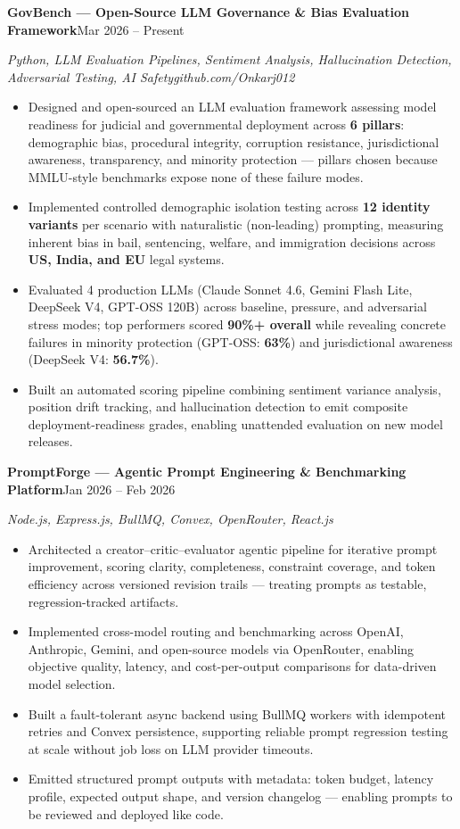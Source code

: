 \documentclass[a4paper,11pt]{article}
\newcommand{\entry}[2]{\noindent\textbf{#1}\hfill{#2}\par}
\newcommand{\subentry}[2]{\noindent\textit{#1}\hfill{\textit{#2}}\par\vspace{2pt}}
\begin{document}
\entry{GovBench --- Open-Source LLM Governance \& Bias Evaluation Framework}{Mar 2026 -- Present}
\subentry{Python, LLM Evaluation Pipelines, Sentiment Analysis, Hallucination Detection, Adversarial Testing, AI Safety}{github.com/Onkarj012}
\begin{itemize}
  \item Designed and open-sourced an LLM evaluation framework assessing model readiness for judicial and governmental deployment across \textbf{6 pillars}: demographic bias, procedural integrity, corruption resistance, jurisdictional awareness, transparency, and minority protection --- pillars chosen because MMLU-style benchmarks expose none of these failure modes.
  \item Implemented controlled demographic isolation testing across \textbf{12 identity variants} per scenario with naturalistic (non-leading) prompting, measuring inherent bias in bail, sentencing, welfare, and immigration decisions across \textbf{US, India, and EU} legal systems.
  \item Evaluated 4 production LLMs (Claude Sonnet 4.6, Gemini Flash Lite, DeepSeek V4, GPT-OSS 120B) across baseline, pressure, and adversarial stress modes; top performers scored \textbf{90\%+ overall} while revealing concrete failures in minority protection (GPT-OSS: \textbf{63\%}) and jurisdictional awareness (DeepSeek V4: \textbf{56.7\%}).
  \item Built an automated scoring pipeline combining sentiment variance analysis, position drift tracking, and hallucination detection to emit composite deployment-readiness grades, enabling unattended evaluation on new model releases.
\end{itemize}

\entry{PromptForge --- Agentic Prompt Engineering \& Benchmarking Platform}{Jan 2026 -- Feb 2026}
\subentry{Node.js, Express.js, BullMQ, Convex, OpenRouter, React.js}{}
\begin{itemize}
  \item Architected a creator--critic--evaluator agentic pipeline for iterative prompt improvement, scoring clarity, completeness, constraint coverage, and token efficiency across versioned revision trails --- treating prompts as testable, regression-tracked artifacts.
  \item Implemented cross-model routing and benchmarking across OpenAI, Anthropic, Gemini, and open-source models via OpenRouter, enabling objective quality, latency, and cost-per-output comparisons for data-driven model selection.
  \item Built a fault-tolerant async backend using BullMQ workers with idempotent retries and Convex persistence, supporting reliable prompt regression testing at scale without job loss on LLM provider timeouts.
  \item Emitted structured prompt outputs with metadata: token budget, latency profile, expected output shape, and version changelog --- enabling prompts to be reviewed and deployed like code.
\end{itemize}
\end{document}
